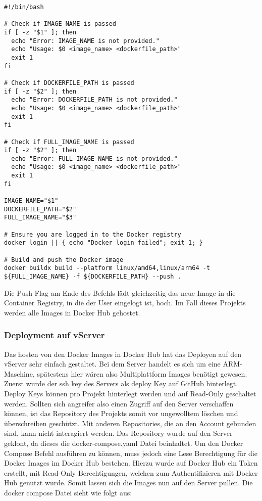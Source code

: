 \begin{lstlisting}[label={lst:lst-shell-buildx-build}]
#!/bin/bash

# Check if IMAGE_NAME is passed
if [ -z "$1" ]; then
  echo "Error: IMAGE_NAME is not provided."
  echo "Usage: $0 <image_name> <dockerfile_path>"
  exit 1
fi

# Check if DOCKERFILE_PATH is passed
if [ -z "$2" ]; then
  echo "Error: DOCKERFILE_PATH is not provided."
  echo "Usage: $0 <image_name> <dockerfile_path>"
  exit 1
fi

# Check if FULL_IMAGE_NAME is passed
if [ -z "$2" ]; then
  echo "Error: FULL_IMAGE_NAME is not provided."
  echo "Usage: $0 <image_name> <dockerfile_path>"
  exit 1
fi

IMAGE_NAME="$1"
DOCKERFILE_PATH="$2"
FULL_IMAGE_NAME="$3"

# Ensure you are logged in to the Docker registry
docker login || { echo "Docker login failed"; exit 1; }

# Build and push the Docker image
docker buildx build --platform linux/amd64,linux/arm64 -t ${FULL_IMAGE_NAME} -f ${DOCKERFILE_PATH} --push .
\end{lstlisting}

Die Push Flag am Ende des Befehls lädt gleichzeitig das neue Image in die Container Registry, in die der User eingelogt ist, hoch.
Im Fall dieses Projekts werden alle Images in Docker Hub gehostet.

\subsubsection{Deployment auf vServer}
Das hosten von den Docker Images in Docker Hub hat das Deployen auf den vServer sehr einfach gestaltet.
Bei dem Server handelt es sich um eine ARM-Maschine, spätestens hier wären also Multiplattform Images benötigt gewesen.
Zuerst wurde der ssh key des Servers als deploy Key auf GitHub hinterlegt.
Deploy Keys können pro Projekt hinterlegt werden und auf Read-Only geschaltet werden.
Sollten sich angreifer also einen Zugriff auf den Server verschaffen können, ist das Repository des Projekts somit vor ungewolltem löschen und überschreiben geschützt.
Mit anderen Repositories, die an den Account gebunden sind, kann nicht interagiert werden.
Das Repository wurde auf den Server geklont, da dieses die docker-compose.yaml Datei beinhaltet.
Um den Docker Compose Befehl ausführen zu können, muss jedoch eine Lese Berechtigung für die Docker Images im Docker Hub bestehen.
Hierzu wurde auf Docker Hub ein Token erstellt, mit Read-Only Berechtigungen, welchen zum Authentifizieren mit Docker Hub genutzt wurde.
Somit lassen sich die Images nun auf den Server pullen.
Die docker compose Datei sieht wie folgt aus:

